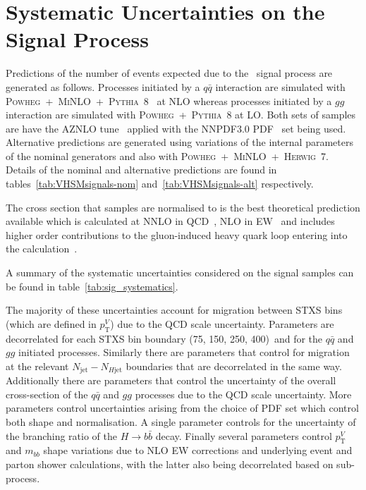 \section{Systematic Uncertainties on the Signal Process}

Predictions of the number of events expected due to the \VHbb\ signal process
are generated as follows. Processes initiated by a $q\bar{q}$ interaction are
simulated with
\textsc{Powheg}~+~\textsc{MiNLO}~+~\textsc{Pythia}~8~\cite{Luisoni2013,
  Sjostrand2008852} at NLO whereas processes initiated by a $gg$ interaction are
simulated with \textsc{Powheg}~+~\textsc{Pythia}~8 at LO. Both sets of samples
are have the AZNLO tune~\cite{Aad:2014xaa} applied with the NNPDF3.0
PDF~\cite{Ball:2014uwa} set being used. Alternative predictions are generated 
using variations of the internal parameters of the nominal generators and also
with \textsc{Powheg}~+~\textsc{MiNLO}~+~\textsc{Herwig}~7. Details of the
nominal and alternative predictions are found in
tables~\ref{tab:VHSMsignals-nom} and~\ref{tab:VHSMsignals-alt} respectively.

The cross section that samples are normalised to is the best theoretical
prediction available which is calculated at NNLO in QCD~\cite{Brein:2003wg,
  Brein:2011vx}, NLO in EW~\cite{Denner:2012sx} and includes higher order
contributions to the gluon-induced heavy quark loop entering into the \ZH
calculation~\cite{Altenkamp:2012sx}.

A summary of the systematic uncertainties considered on the signal samples can
be found in table~\ref{tab:sig_systematics}.

The majority of these uncertainties account for migration between STXS bins
(which are defined in $p_{\mathrm{T}}^V$) due to the QCD scale uncertainty. Parameters are
decorrelated for each STXS bin boundary (75, 150, 250, 400)~\GeV and for the
$q\bar{q}$ and $gg$ initiated processes. Similarly there are parameters that
control for migration at the relevant $N_{\text{jet}} - N_{H\text{jet}}$
boundaries that are decorrelated in the same way. Additionally there are
parameters that control the uncertainty of the overall cross-section of the
$q\bar{q}$ and $gg$ processes due to the QCD scale uncertainty. More parameters
control uncertainties arising from the choice of PDF set which control both
shape and normalisation. A single parameter controls for the uncertainty of the
branching ratio of the $H \to b{\bar{b}}$ decay. Finally several parameters
control  $p_{\mathrm{T}}^V$ and $m_{bb}$ shape variations due to NLO EW corrections and
underlying event and parton shower calculations, with the latter also being
decorrelated based on sub-process. 